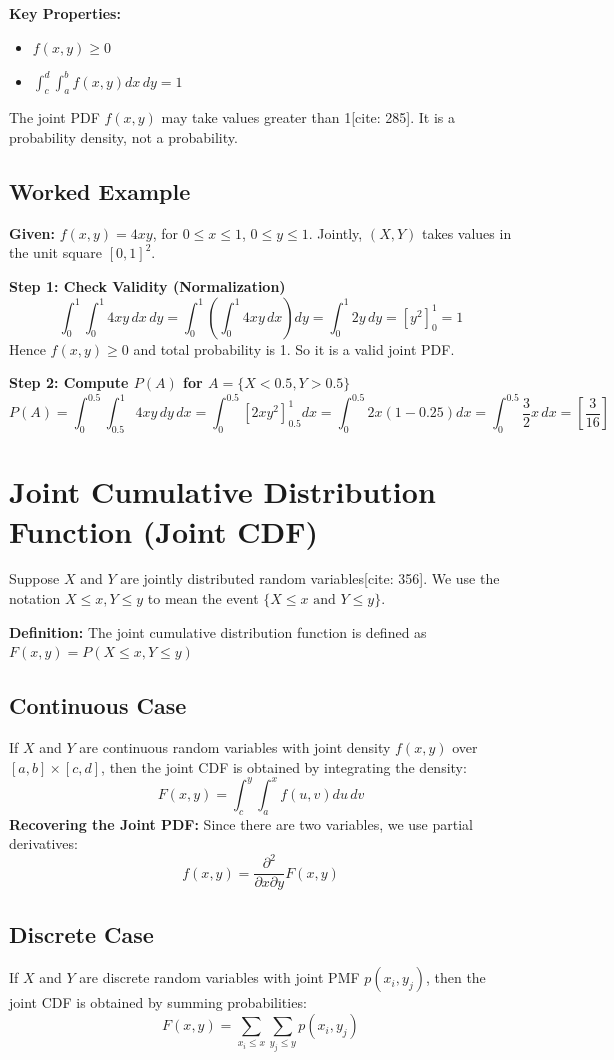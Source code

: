 \documentclass[12pt]{article}
\begin{document}
\textbf{Key Properties:}
\begin{itemize}
    \item $f(x,y) \ge 0$ 
    \item $\int_{c}^{d} \int_{a}^{b} f(x,y) dx\,dy = 1$ 
\end{itemize}
The joint PDF $f(x,y)$ may take values greater than 1[cite: 285]. It is a probability density, not a probability.

\subsection{Worked Example}
\textbf{Given:} $f(x,y) = 4xy$, for $0 \le x \le 1$, $0 \le y \le 1$.
Jointly, $(X, Y)$ takes values in the unit square $[0, 1]^2$.

\textbf{Step 1: Check Validity (Normalization)} 
\[
\int_{0}^{1}\int_{0}^{1} 4xy \,dx\,dy = \int_{0}^{1}\left(\int_{0}^{1} 4xy \,dx\right)dy = \int_{0}^{1} 2y \,dy = [y^2]_{0}^{1} = 1
\] 
Hence $f(x,y) \ge 0$ and total probability is 1. So it is a valid joint PDF.

\textbf{Step 2: Compute $P(A)$ for $A = \{X < 0.5, Y > 0.5\}$} 
\[
P(A) = \int_{0}^{0.5}\int_{0.5}^{1} 4xy \,dy\,dx = \int_{0}^{0.5} [2xy^2]_{0.5}^{1} dx = \int_{0}^{0.5} 2x(1 - 0.25) dx = \int_{0}^{0.5} \frac{3}{2}x \,dx = \left[\frac{3}{16}\right]
\] 

\section{Joint Cumulative Distribution Function (Joint CDF)}
Suppose $X$ and $Y$ are jointly distributed random variables[cite: 356].
We use the notation $X \le x, Y \le y$ to mean the event $\{X \le x \text{ and } Y \le y\}$.

\textbf{Definition:}
The joint cumulative distribution function is defined as
$F(x,y) = P(X \le x, Y \le y)$

\subsection{Continuous Case}
If $X$ and $Y$ are continuous random variables with joint density $f(x,y)$ over $[a,b] \times [c,d]$, then the joint CDF is obtained by integrating the density:
\[
F(x,y) = \int_{c}^{y}\int_{a}^{x} f(u,v) du\,dv
\] 
\textbf{Recovering the Joint PDF:}
Since there are two variables, we use partial derivatives:
\[
f(x,y) = \frac{\partial^2}{\partial x \partial y} F(x,y)
\] 

\subsection{Discrete Case}
If $X$ and $Y$ are discrete random variables with joint PMF $p(x_i, y_j)$, then the joint CDF is obtained by summing probabilities:
\[
F(x,y) = \sum_{x_i \le x} \sum_{y_j \le y} p(x_i, y_j)
\] 
\end{document}
